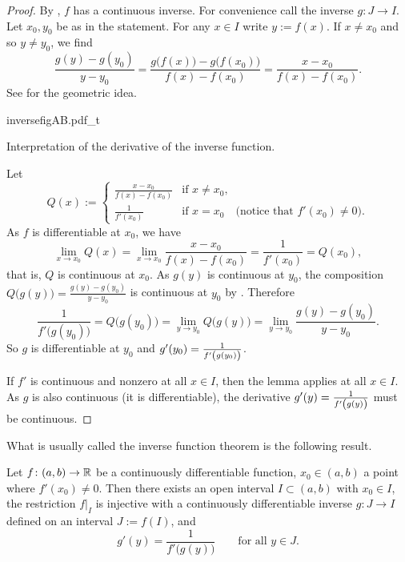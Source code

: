 \begin{proof}
By , $f$ has a continuous inverse.  For convenience
call the inverse $g \colon J \to I$.
Let $x_0,y_0$ be as in the statement.  For any $x \in I$ write $y := f(x)$.
If $x \not= x_0$ and so $y \not= y_0$, we find
\begin{equation*}
\frac{g(y)-g(y_0)}{y-y_0} =
\frac{g\bigl(f(x)\bigr)-g\bigl(f(x_0)\bigr)}{f(x)-f(x_0)} =
\frac{x-x_0}{f(x)-f(x_0)} .
\end{equation*}
See  for the geometric idea.
\begin{myfigureht}
{inversefigAB.pdf_t}
\caption{Interpretation of the derivative of the inverse
function.\label{inversefig}}
\end{myfigureht}

Let
\begin{equation*}
Q(x) :=
\begin{cases}
\frac{x-x_0}{f(x)-f(x_0)} & \text{if } x \neq x_0, \\
\frac{1}{f'(x_0)}         & \text{if } x = x_0 \quad \text{(notice that }
f'(x_0) \neq 0 \text{)}.
\end{cases}
\end{equation*}
As $f$ is differentiable at $x_0$, 
we have
\begin{equation*}
\lim_{x \to x_0} Q(x) =
\lim_{x \to x_0} 
\frac{x-x_0}{f(x)-f(x_0)} 
=
\frac{1}{f'(x_0)}
=
Q(x_0) ,
\end{equation*}
that is, $Q$ is continuous at $x_0$.
As $g(y)$ is continuous at $y_0$,
the composition $Q\bigl(g(y)\bigr) = \frac{g(y)-g(y_0)}{y-y_0}$
is continuous at $y_0$ by
.
Therefore
\begin{equation*}
\frac{1}{f'\bigl(g(y_0)\bigr)}
= Q\bigl(g(y_0)\bigr)
= \lim_{y \to y_0} Q\bigl(g(y)\bigr)
= \lim_{y \to y_0} \frac{g(y)-g(y_0)}{y-y_0} .
\end{equation*}
So $g$ is differentiable at $y_0$ and $g'(y_0) =
\frac{1}{f'\left(\vphantom{1^1_1}g(y_0)\right)}$.

If $f'$ is continuous and nonzero at all $x \in I$,
then the lemma applies at all $x \in I$.  As $g$ is also
continuous (it is differentiable), the derivative $g'(y) =
\frac{1}{f'\left(\vphantom{1^1_1}g(y)\right)}$ must be continuous.
\end{proof}

What is usually called the inverse function theorem is the following result.

\begin{thm}
Let $f \colon (a,b) \to {\mathbb{R}}$ be a continuously differentiable function,
$x_0 \in (a,b)$ a point where $f'(x_0) \not= 0$.  Then there exists
an open interval $I \subset (a,b)$ with $x_0 \in I$, the
restriction $f|_{I}$ is injective with a continuously differentiable inverse
$g \colon J \to I$ defined on an interval $J := f(I)$,
and
\begin{equation*}
g'(y) = \frac{1}{f'\bigl( g(y) \bigr)} \qquad \text{for all } y \in J.
\end{equation*}
\end{thm}

